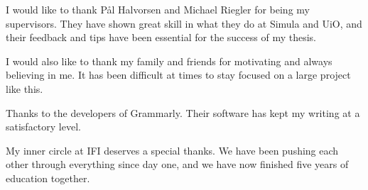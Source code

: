 I would like to thank Pål Halvorsen and Michael Riegler for being my supervisors. They have shown great skill in what they do at Simula and UiO, and their feedback and tips have been essential for the success of my thesis.

I would also like to thank my family and friends for motivating and always believing in me. It has been difficult at times to stay focused on a large project like this.

Thanks to the developers of Grammarly. Their software has kept my writing at a satisfactory level.

My inner circle at IFI deserves a special thanks. We have been pushing each other through everything since day one, and we have now finished five years of education together.